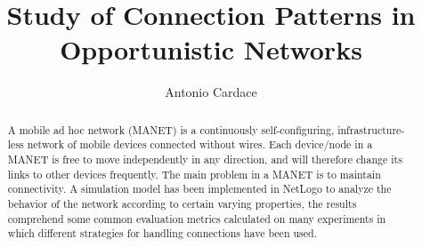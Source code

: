 \documentclass{llncs}
\begin{document}
%
\title{Study of Connection Patterns in Opportunistic Networks}
%
\author{Antonio Cardace}
%
\maketitle
%
\begin{abstract}
A mobile ad hoc network (MANET) is a continuously self-configuring, infrastructure-less network of mobile devices connected without wires. Each   device/node in a MANET is free to move independently in any direction, and   will therefore change its links to other devices frequently. The main problem in a MANET is to maintain connectivity. A simulation model has been implemented in NetLogo to analyze the behavior of the network according to certain varying properties, the results comprehend some common evaluation metrics calculated on many experiments in which different strategies for handling connections have been used.
\end{abstract}
\end{document}
